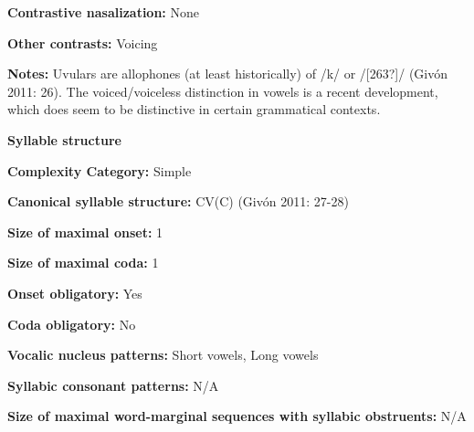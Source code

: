 \begin{styleBody}
\textbf{Contrastive nasalization:} None
\end{styleBody}

\begin{styleBody}
\textbf{Other contrasts:} Voicing
\end{styleBody}

\begin{styleBody}
\textbf{Notes:} Uvulars are allophones (at least historically) of /k/ or /[263?]/ (Givón 2011: 26). The voiced/voiceless distinction in vowels is a recent development, which does seem to be distinctive in certain grammatical contexts.
\end{styleBody}

\begin{styleBody}
\textbf{Syllable structure}
\end{styleBody}

\begin{styleBody}
\textbf{Complexity Category:} Simple
\end{styleBody}

\begin{styleBody}
\textbf{Canonical syllable structure:} CV(C)\textbf{ }(Givón 2011: 27-28)
\end{styleBody}

\begin{styleBody}
\textbf{Size of maximal onset:} 1
\end{styleBody}

\begin{styleBody}
\textbf{Size of maximal coda:} 1
\end{styleBody}

\begin{styleBody}
\textbf{Onset obligatory:} Yes
\end{styleBody}

\begin{styleBody}
\textbf{Coda obligatory:} No
\end{styleBody}

\begin{styleBody}
\textbf{Vocalic nucleus patterns:} Short vowels, Long vowels
\end{styleBody}

\begin{styleBody}
\textbf{Syllabic consonant patterns:} N/A
\end{styleBody}

\begin{styleBody}
\textbf{Size of maximal word{}-marginal sequences with syllabic obstruents:} N/A
\end{styleBody}

